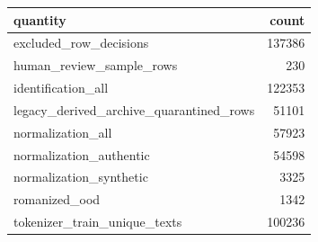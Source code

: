 \begin{tabular}{lr}
\toprule
quantity & count \\
\midrule
excluded\_row\_decisions & 137386 \\
human\_review\_sample\_rows & 230 \\
identification\_all & 122353 \\
legacy\_derived\_archive\_quarantined\_rows & 51101 \\
normalization\_all & 57923 \\
normalization\_authentic & 54598 \\
normalization\_synthetic & 3325 \\
romanized\_ood & 1342 \\
tokenizer\_train\_unique\_texts & 100236 \\
\bottomrule
\end{tabular}
